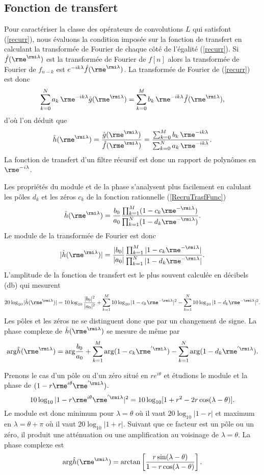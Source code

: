 \subsection{Fonction de transfert}
Pour caract\'eriser la classe des op\'erateurs de convolutions $L$
qui satisfont (\ref{recurr}),
nous \'evaluons la condition impos\'ee
sur la fonction de transfert en calculant
la transform\'ee de Fourier de chaque c\^ot\'e de l'\'egalit\'e
(\ref{recurr}).
Si $\hat f({\rme^{\rmi \lambda}})$ est la transform\'ee de Fourier de $f[n]$
alors la transform\'ee de Fourier
de $f_{n-k}$ est $e^{-i k \lambda} \hat f({\rme^{\rmi \lambda}})$. La transform\'ee
de Fourier de (\ref{recurr}) est donc
\[
\sum_{k=0}^N a_k \,\rme^{-ik \lambda} \hat g({\rme^{\rmi \lambda}})
=
\sum_{k=0}^M b_k \,\rme^{-ik\lambda} \hat f({\rme^{\rmi \lambda}}) ,
\]
d'o\`u l'on d\'eduit que
\begin{equation}
\label{RecruTrasfFunc}
\hat h({\rme^{\rmi \lambda}}) = \frac {\hat g({\rme^{\rmi \lambda}})} {\hat f({\rme^{\rmi \lambda}})} =
\frac {\sum_{k=0}^M b_k \,\rme^{-ik\lambda}} {\sum_{k=0}^N a_k \,
\rme^{-ik\lambda} }.
\end{equation}
La fonction de transfert d'un filtre r\'ecursif est donc un rapport
de polyn\^{o}mes en $\rme^{-i\lambda}$.

Les propri\'et\'es du module
et de la phase s'analysent plus facilement en calulant les
p\^oles $d_k$ et les z\'eros $c_k$ de la fonction rationnelle
(\ref{RecruTrasfFunc})
\[
\hat h({\rme^{\rmi \lambda}}) = \frac {b_0} {a_0} \frac
{\prod_{k=1}^M (1 - c_k \rme^{-\rmi \lambda})} {\prod_{k=1}^N (1 - d_k \rme^{-\rmi \lambda})} .
\]
Le module de la transform\'ee de Fourier est donc
\[
|\hat h({\rme^{\rmi \lambda}})| = \frac {|b_0|} {|a_0|} \frac
{\prod_{k=1}^M |1 - c_k {\rme^{-\rmi \lambda}}|} {\prod_{k=1}^N |1 - d_k {\rme^{-\rmi \lambda}}|} .
\]
L'amplitude de la fonction de transfert
est le plus souvent calcul\'ee en d\'ecibels (db) qui mesurent
\[
20 \log_{10} |\hat h({\rme^{\rmi \lambda}})| =
10 \log_{10} \frac {|b_0|^2} {|a_0|^2} +
\sum _{k=1}^M 10 \log_{10} |1 - c_k {\rme^{-\rmi \lambda}}|^2
- \sum_{k=1}^N 10 \log_{10} |1 - d_k {\rme^{-\rmi \lambda}}|^2 .
\]
Les p\^oles et les z\'eros ne se distinguent donc que par un changement
de signe. La phase complexe de $\hat h({\rme^{\rmi \lambda}})$ se mesure de m\^eme par
\[
\arg \hat h({\rme^{\rmi \lambda}}) = \arg \frac {b_0} {a_0} +
\sum _{k=1}^M \arg (1 - c_k {\rme^{'\rmi \lambda}})
- \sum_{k=1}^N \arg (1 - d_k {\rme^{'\rmi \lambda}}) .
\]
\begin{example}
Prenons le cas d'un p\^ole ou d'un z\'ero situ\'e en $re^{i\theta}$
et \'etudions le module et la phase de $(1-r \rme^{i \theta} {\rme^{'\rmi \lambda}})$.
\[
10 \log_{10} |1-r \rme^{i \theta} {\rme^{'\rmi \lambda}}|^2 =
10 \log_{10} [ 1 + r^2 - 2r\cos(\lambda - \theta) ] .
\]
Le module est donc minimum pour $\lambda = \theta$ o\`u il vaut
$20 \log_{10} |1-r|$ et
maximum en $\lambda = \theta + \pi$ o\`u il vaut
$20 \log_{10} |1+r|$.
Suivant que ce facteur est un p\^ole ou un z\'ero, il produit
une att\'enuation ou une
amplification au voisinage de $\lambda = \theta$.
La phase complexe est
\[
\arg\hat h({\rme^{\rmi \lambda}}) = \arctan \left[
\frac {r \sin(\lambda - \theta)} {1 -r \cos(\lambda - \theta)} \right] .
\]
\end{example}

